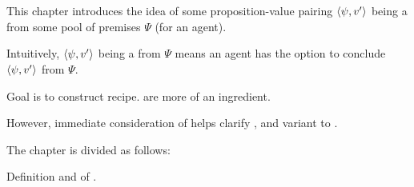 \chapter{}
\label{cha:fcs}

\nocite{Ryle:1946tu}

\begin{note}
  This chapter introduces the idea of some proposition-value pairing \(\langle \psi, v' \rangle\) being a \emph{\fc{}} from some pool of premises \(\Psi\) (for an agent).

  Intuitively, \(\langle \psi, v' \rangle\) being a \fc{} from \(\Psi\) means an agent has the option to conclude \(\langle \psi, v' \rangle\) from \(\Psi\).
\end{note}

\begin{note}
  Goal is to construct recipe.
   are more of an ingredient.

  However, immediate consideration of  helps clarify \ros{}, and variant to \qWhy{}.
\end{note}





\begin{note}
  The chapter is divided as follows:
  \begin{TOCEnum}
  \item

    Definition and  of .
  \end{TOCEnum}
\end{note}

